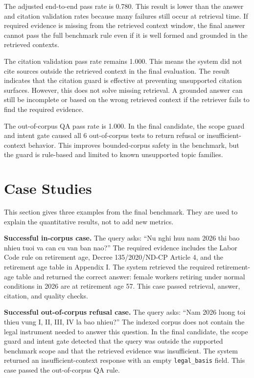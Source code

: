 The adjusted end-to-end pass rate is 0.780. This result is lower than the answer and citation validation rates because many failures still occur at retrieval time. If required evidence is missing from the retrieved context window, the final answer cannot pass the full benchmark rule even if it is well formed and grounded in the retrieved contexts.

The citation validation pass rate remains 1.000. This means the system did not cite sources outside the retrieved context in the final evaluation. The result indicates that the citation guard is effective at preventing unsupported citation surfaces. However, this does not solve missing retrieval. A grounded answer can still be incomplete or based on the wrong retrieved context if the retriever fails to find the required evidence.

The out-of-corpus QA pass rate is 1.000. In the final candidate, the scope guard and intent gate caused all 6 out-of-corpus tests to return refusal or insufficient-context behavior. This improves bounded-corpus safety in the benchmark, but the guard is rule-based and limited to known unsupported topic families.

\section{Case Studies}
\label{sec:case-studies}

This section gives three examples from the final benchmark. They are used to explain the quantitative results, not to add new metrics.

\textbf{Successful in-corpus case.} The query asks: ``Nu nghi huu nam 2026 thi bao nhieu tuoi va can cu van ban nao?'' The required evidence includes the Labor Code rule on retirement age, Decree 135/2020/ND-CP Article 4, and the retirement age table in Appendix I. The system retrieved the required retirement-age table and returned the correct answer: female workers retiring under normal conditions in 2026 are at retirement age 57. This case passed retrieval, answer, citation, and quality checks.

\textbf{Successful out-of-corpus refusal case.} The query asks: ``Nam 2026 luong toi thieu vung I, II, III, IV la bao nhieu?'' The indexed corpus does not contain the legal instrument needed to answer this question. In the final candidate, the scope guard and intent gate detected that the query was outside the supported benchmark scope and that the retrieved evidence was insufficient. The system returned an insufficient-context response with an empty \texttt{legal\_basis} field. This case passed the out-of-corpus QA rule.

